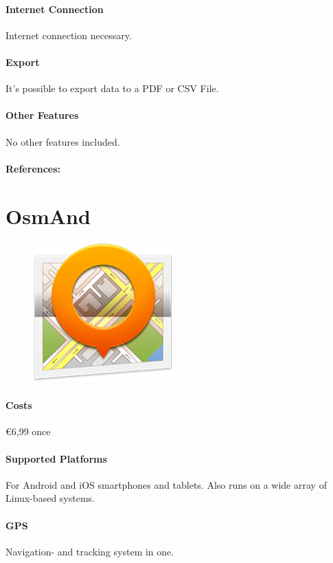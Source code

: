 \paragraph{Internet Connection} Internet connection necessary.
\paragraph{Export} It’s possible to export data to a PDF or CSV File.
\paragraph{Other Features} No other features included.
\paragraph{References:} \cite{miles}
\newpage

\section{OsmAnd} 
\begin{figure}
  \begin{center}
    \includegraphics[width=0.48\textwidth]{bilder/osmand}
  \end{center}
\end{figure} 
\paragraph{Costs} \euro 6,99 once
\paragraph{Supported Platforms} For Android and iOS smartphones and tablets. Also runs on a wide array of Linux-based systems.
\paragraph{GPS} Navigation- and tracking  system in one.
